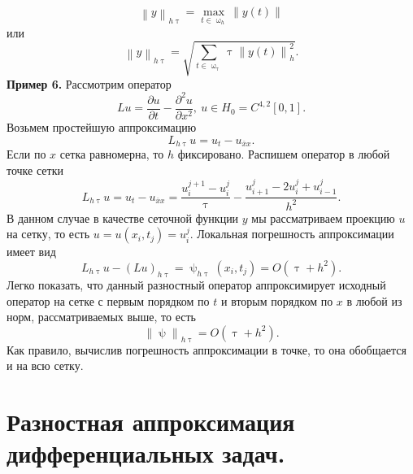 \documentclass[a4paper, 12pt]{report}
\numberwithin{equation}{section}
\newcommand{\ol}{\overline}
\renewcommand{\tau}{\uptau}
\renewcommand{\psi}{\uppsi}
\renewcommand{\omega}{\upomega}
\renewcommand{\d}{\partial}
\newcommand\Norm[1]{\left\| #1 \right\|}
\begin{document}
		$$\Norm{y}_{h\tau} = \underset{t \in \omega_h}{\max}\Norm{y(t)}$$
		или 
		$$\Norm{y}_{h\tau} = \sqrt{\sum_{t \in \omega_\tau}\tau \Norm{y(t)}_h^2}.$$
		\textbf{Пример 6.}
		Рассмотрим оператор $$Lu = \dfrac{\d u}{\d t} - \dfrac{\d ^2 u}{\d x ^2},\ u \in H_0 = C^{4,2}[0,1].$$
		Возьмем простейшую аппроксимацию
		$$L_{h\tau}u = u_t - u_{\ol xx}.$$
		Если по $x$ сетка равномерна, то $h$ фиксировано. Распишем оператор в любой точке сетки
		$$L_{h\tau}u = u_t - u_{\ol xx} = \dfrac{u_i^{j+1} - u_i^j}{\tau} - \dfrac{u_{i+1}^j - 2u_i^j + u_{i-1}^j}{h^2}.$$
		В данном случае в качестве сеточной функции $y$ мы рассматриваем проекцию $u$ на сетку, то есть $u=u(x_i, t_j) = u_i^j$.
		Локальная погрешность аппроксимации имеет вид $$L_{h\tau}u - (Lu)_{h\tau} = \psi_{h\tau}(x_i, t_j) = O(\tau + h^2).$$
		Легко показать, что данный разностный оператор аппроксимирует исходный оператор на сетке с первым порядком по $t$ и вторым порядком по $x$ в любой из норм, рассматриваемых выше, то есть 
		$$\Norm{\psi}_{h\tau} = O(\tau + h^2).$$
		Как правило, вычислив погрешность аппроксимации в точке, то она обобщается и на всю сетку.
		\section{Разностная аппроксимация дифференциальных задач.}
\end{document}
